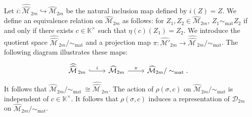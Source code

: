 \documentclass[11pt]{amsart}
\theoremstyle{plain}
\theoremstyle{definition}
\theoremstyle{remark}
\begin{document}
Let $i \colon \widehat{\widehat{\mathcal{M}\,}}_{2m} \hookrightarrow \widehat{\mathcal{M}}_{2m}$ be the natural inclusion map defined by $i(Z) = Z$.
We define an equivalence relation on $\widehat{\mathcal{M}}_{2m}$ as follows: for $Z_1, Z_2 \in \widehat{\mathcal{M}}_{2m}$,
$Z_1 \sim_{\text{mat}} Z_2$ if and only if there exists $c\in \mathbb{K}^{\times}$ such that $\eta(c)(Z_1) = Z_2$.
We introduce the quotient space $\widehat{\widehat{\mathcal{M}\,}}_{2m}/\sim_{\text{mat}}$ 
and a projection map 
$\pi: \widehat{\mathcal{M}'}_{2m} \rightarrow \widehat{\widehat{\mathcal{M}\,}}_{2m}/\sim_{\text{mat}}$. 
The following diagram illustrates these maps:
\begin{equation}
\begin{tikzcd}
\widehat{\widehat{\mathcal{M}\,}}_{2m} \arrow[r,hookrightarrow,"i"] &
\widehat{\mathcal{M}}_{2m} \arrow[r,rightarrow,"\pi"] &
\widehat{\mathcal{M}}_{2m}/\sim_{\text{mat}}. 
\end{tikzcd}
\end{equation}
It follows that $\widehat{\mathcal{M}}_{2m}/\sim_{\text{mat}} \ \cong \widehat{\widehat{\mathcal{M}\,}}_{2m}$.
The action of $\rho(\sigma,c)$ on $\widehat{\mathcal{M}}_{2m}/\sim_{\text{mat}}$ is independent of $c\in\mathbb{K}^\times$.
It follows that $\rho(\sigma,c)$ induces a representation of $\mathcal{D}_{2m}$ on
$\widehat{\mathcal{M}}_{2m}/\sim_{\text{mat}}$.

\end{document}
